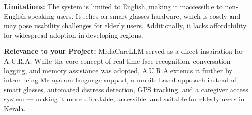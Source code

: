 \textbf{Limitations:}
The system is limited to English, making it inaccessible to non-English-speaking users. It relies on smart glasses hardware, which is costly and may pose usability challenges for elderly users. Additionally, it lacks affordability for widespread adoption in developing regions.

\textbf{Relevance to your Project:}
MedaCareLLM served as a direct inspiration for A.U.R.A. While the core concept of real-time face recognition, conversation logging, and memory assistance was adopted, A.U.R.A extends it further by introducing Malayalam language support, a mobile-based approach instead of smart glasses, automated distress detection, GPS tracking, and a caregiver access system --- making it more affordable, accessible, and suitable for elderly users in Kerala.


